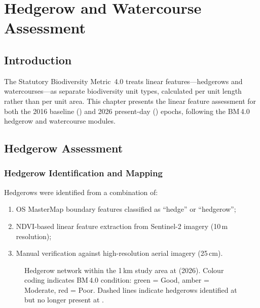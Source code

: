 \chapter{Hedgerow and Watercourse Assessment}
\label{ch:linear}

\section{Introduction}

The Statutory Biodiversity Metric~4.0 treats linear features—hedgerows and watercourses—as separate biodiversity unit types, calculated per unit length rather than per unit area. This chapter presents the linear feature assessment for both the 2016 baseline (\Tzero) and 2026 present-day (\Tone) epochs, following the BM\,4.0 hedgerow and watercourse modules.


\section{Hedgerow Assessment}

\subsection{Hedgerow Identification and Mapping}

Hedgerows were identified from a combination of:
\begin{enumerate}[nosep]
  \item OS MasterMap boundary features classified as ``hedge'' or ``hedgerow'';
  \item NDVI-based linear feature extraction from Sentinel-2 imagery (10\,m resolution);
  \item Manual verification against high-resolution aerial imagery (25\,cm).
\end{enumerate}

\begin{figure}[H]
\centering
{}
\caption{Hedgerow network within the 1\,km study area at \Tone{} (2026). Colour coding indicates BM\,4.0 condition: green = Good, amber = Moderate, red = Poor. Dashed lines indicate hedgerows identified at \Tzero{} but no longer present at \Tone.}
\label{fig:hedgerow-map}
\end{figure}

